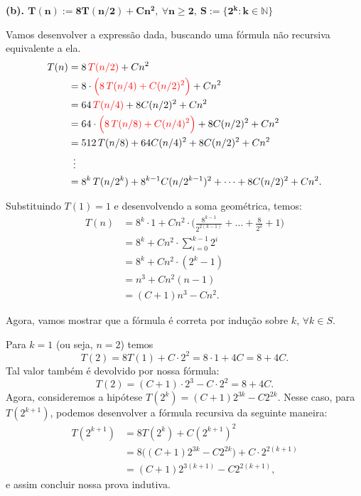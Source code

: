 \documentclass[a4paper]{article}
\begin{document}
\newpage

\textbf{(b). $\bm{T(n) := 8T(n/2) + Cn^2, \: \forall n \ge 2, \: S:= \{ 2^k : k \in \mathbb N \}}$}

Vamos desenvolver a expressão dada, buscando uma fórmula não recursiva equivalente a ela.
\begin{align*}
    T(n) & = 8 \, \color{red} T(n/2) \color{black} + Cn^2 \\
    & = 8 \cdot \color{red} \Big( 8 \, T(n/4) + C(n/2)^2 \Big) \color{black} + Cn^2 \\
    & = 64 \, \color{red} T(n/4) \color{black} + 8C(n/2)^2 + Cn^2 \\
    & = 64 \cdot \color{red} \Big( 8 \, T(n/8) + C(n/4)^2 \Big) \color{black} + 8C(n/2)^2 + Cn^2 \\
    & = 512 \, T(n/8) + 64C(n/4)^2 + 8C(n/2)^2 + Cn^2 \\
    & \: \; \vdots \\
    & = 8^k \, T(n/2^k) + 8^{k-1}C(n/2^{k-1})^2 + \dots + 8C(n/2)^2 + Cn^2.
\end{align*}

Substituindo $T(1) = 1$ e desenvolvendo a soma geométrica, temos:
\begin{align*}
    T(n) & = 8^k \cdot 1 + Cn^2 \cdot \Big( \frac{8^{k-1}}{2^{2(k-1)}} + \dots + \frac{8}{2^2} + 1 \Big) \\
    & = 8^k + Cn^2 \cdot \sum_{i=0}^{k-1} 2^i \\
    & = 8^k + Cn^2 \cdot (2^k - 1) \\
    & = n^3 + Cn^2(n-1) \\
    & = (C+1)n^3 - Cn^2.
\end{align*}

Agora, vamos mostrar que a fórmula é correta por indução sobre $k$, $\forall k \in S$.

Para $k=1$ (ou seja, $n=2$) temos
\[ T(2) = 8T(1) + C \cdot 2^2 = 8 \cdot 1 + 4C = 8 + 4C. \]
Tal valor também é devolvido por nossa fórmula:
\[ T(2) = (C+1) \cdot 2^3 - C \cdot 2^2 = 8 + 4C. \]
Agora, consideremos a hipótese $T(2^k) = (C+1)2^{3k} - C2^{2k}$. Nesse caso, para $T(2^{k+1})$, podemos desenvolver a fórmula recursiva da seguinte maneira:
\begin{align*}
T(2^{k+1}) &= 8T(2^k) + C(2^{k+1})^2 \\
&= 8\big((C+1)2^{3k} - C2^{2k}\big) + C \cdot 2^{2(k+1)} \\
&= (C+1) 2^{3(k+1)} - C 2^{2(k+1)},
\end{align*}
e assim concluir nossa prova indutiva.
\end{document}
